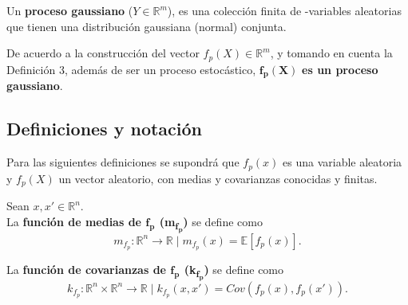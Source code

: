 \begin{defin}
    Un \textbf{proceso gaussiano} ($Y \in \mathbb{R}^m$), es una colección finita de -variables aleatorias que tienen una distribución gaussiana (normal) conjunta.
\end{defin}

\begin{obs*}
    De acuerdo a la construcci\'on del vector $f_p(X) \in \mathbb{R}^m$, y tomando en cuenta la Definici\'on 3, además de ser un proceso estoc\'astico, $\bm{f_p(X)}$ \textbf{es un proceso gaussiano}.
\end{obs*}


\subsection{Definiciones y notaci\'on}

Para las siguientes definiciones se supondrá que $f_p(x)$ es una variable aleatoria y $f_p(X)$ un vector aleatorio, con medias y covarianzas conocidas y finitas.

\begin{defin*}
Sean $x,x' \in \mathbb{R}^n$. \\

La \textbf{función de medias de $\bm{f_p}$ (m\textsubscript{$\bm{f_p}$})} se define como 
\begin{equation*}
    m_{f_p}: \mathbb{R}^n \rightarrow \mathbb{R} 
    \mid
    m_{f_p}(x) = \mathbb{E}[f_p(x)].
\end{equation*}

La \textbf{función de covarianzas de $\bm{f_p}$ (k\textsubscript{$\bm{f_p}$})} se define como 
\begin{equation*}
    k_{f_p}: \mathbb{R}^n \times \mathbb{R}^n \rightarrow \mathbb{R} 
    \mid
    k_{f_p}(x, x') = Cov({f_p}(x),{f_p}(x')).
\end{equation*}
\end{defin*}

